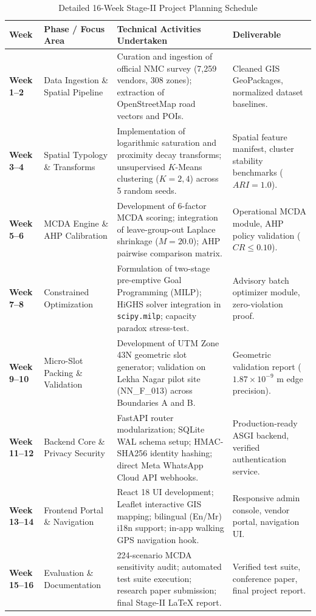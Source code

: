 \begin{table}[htbp]
\caption{Detailed 16-Week Stage-II Project Planning Schedule}
\label{tab:weekly_planning}
\centering
\small
\begin{tabularx}{\textwidth}{lp{}p{}X}
\toprule
\textbf{Week} & \textbf{Phase / Focus Area} & \textbf{Technical Activities Undertaken} & \textbf{Deliverable} \\
\midrule
\textbf{Week 1--2} & Data Ingestion \& Spatial Pipeline & Curation and ingestion of official NMC survey (7,259 vendors, 308 zones); extraction of OpenStreetMap road vectors and POIs. & Cleaned GIS GeoPackages, normalized dataset baselines. \\
\textbf{Week 3--4} & Spatial Typology \& Transforms & Implementation of logarithmic saturation and proximity decay transforms; unsupervised $K$-Means clustering ($K=2, 4$) across 5 random seeds. & Spatial feature manifest, cluster stability benchmarks ($ARI = 1.0$). \\
\textbf{Week 5--6} & MCDA Engine \& AHP Calibration & Development of 6-factor MCDA scoring; integration of leave-group-out Laplace shrinkage ($M=20.0$); AHP pairwise comparison matrix. & Operational MCDA module, AHP policy validation ($CR \le 0.10$). \\
\textbf{Week 7--8} & Constrained Optimization & Formulation of two-stage pre-emptive Goal Programming (MILP); HiGHS solver integration in \texttt{scipy.milp}; capacity paradox stress-test. & Advisory batch optimizer module, zero-violation proof. \\
\textbf{Week 9--10} & Micro-Slot Packing \& Validation & Development of UTM Zone 43N geometric slot generator; validation on Lekha Nagar pilot site (NN\_F\_013) across Boundaries A and B. & Geometric validation report ($1.87\times 10^{-9}\text{ m}$ edge precision). \\
\textbf{Week 11--12} & Backend Core \& Privacy Security & FastAPI router modularization; SQLite WAL schema setup; HMAC-SHA256 identity hashing; direct Meta WhatsApp Cloud API webhooks. & Production-ready ASGI backend, verified authentication service. \\
\textbf{Week 13--14} & Frontend Portal \& Navigation & React 18 UI development; Leaflet interactive GIS mapping; bilingual (En/Mr) i18n support; in-app walking GPS navigation hook. & Responsive admin console, vendor portal, navigation UI. \\
\textbf{Week 15--16} & Evaluation \& Documentation & 224-scenario MCDA sensitivity audit; automated test suite execution; research paper submission; final Stage-II LaTeX report. & Verified test suite, conference paper, final project report. \\
\bottomrule
\end{tabularx}
\end{table}

